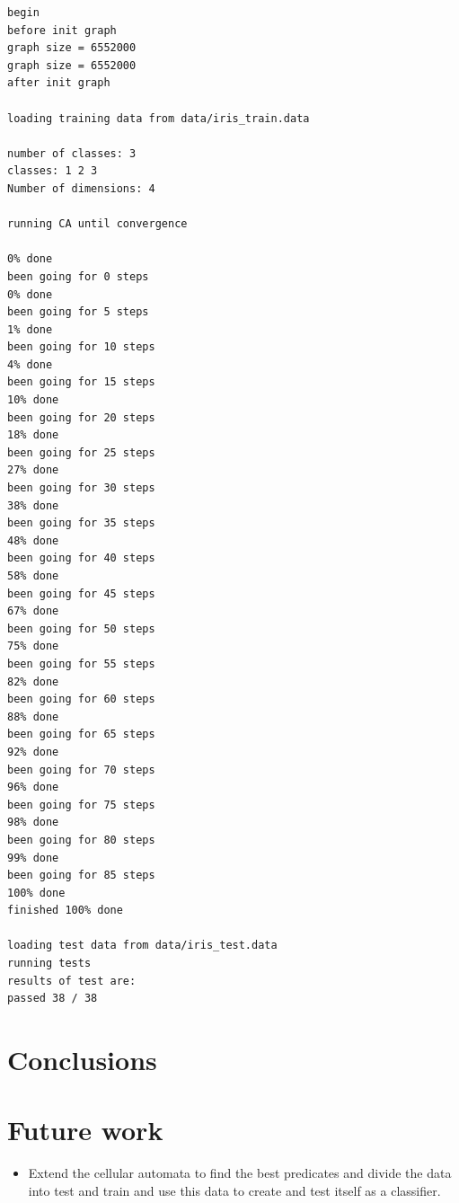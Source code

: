 \documentclass[11pt]{article}
\begin{document}
\begin{verbatim}
begin
before init graph
graph size = 6552000
graph size = 6552000
after init graph

loading training data from data/iris_train.data

number of classes: 3
classes: 1 2 3 
Number of dimensions: 4

running CA until convergence

0% done
been going for 0 steps
0% done
been going for 5 steps
1% done
been going for 10 steps
4% done
been going for 15 steps
10% done
been going for 20 steps
18% done
been going for 25 steps
27% done
been going for 30 steps
38% done
been going for 35 steps
48% done
been going for 40 steps
58% done
been going for 45 steps
67% done
been going for 50 steps
75% done
been going for 55 steps
82% done
been going for 60 steps
88% done
been going for 65 steps
92% done
been going for 70 steps
96% done
been going for 75 steps
98% done
been going for 80 steps
99% done
been going for 85 steps
100% done
finished 100% done

loading test data from data/iris_test.data
running tests
results of test are:
passed 38 / 38
\end{verbatim}

  
\section{Conclusions}
\label{sec-6}

  
\section{Future work}
\label{sec-7}


\begin{itemize}
\item Extend the cellular automata to find the best predicates and divide
   the data into test and train and use this data to create and test
   itself as a classifier.
\end{itemize}



\end{document}
